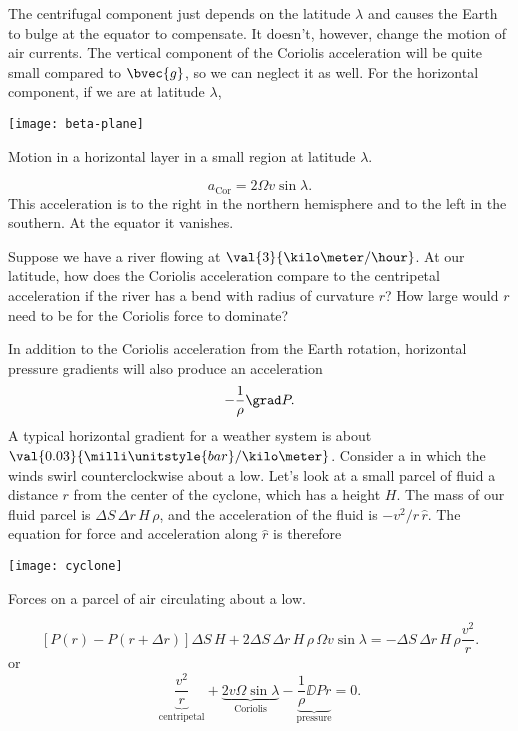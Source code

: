 The centrifugal component just depends on the latitude $\lambda$ and causes the Earth to bulge at the equator to compensate. It doesn't, however, change the motion of air currents.  The vertical component of the Coriolis acceleration will be quite small compared to $\bvec{g}$, so we can neglect it as well. For the horizontal component, if we are at latitude $\lambda$,
\begin{marginfigure}
\texttt{[image: beta-plane]}
\caption{Motion in a horizontal layer in a small region at latitude $\lambda$.}
\end{marginfigure}
\[
a_{\mathrm{Cor}} =  2\Omega v \sin\lambda.
\]
This acceleration is to the right in the northern hemisphere and to the left in the southern.  At the equator it vanishes.

\begin{exercisebox}
Suppose we have a river flowing at $\val{3}{\kilo\meter/\hour}$.  At our latitude, how does the Coriolis acceleration compare to the centripetal acceleration if the river has a bend with radius of curvature $r$?  How large would $r$ need to be for the Coriolis force to dominate?
\end{exercisebox}

In addition to the Coriolis acceleration from the Earth rotation, horizontal pressure gradients will also produce an acceleration
\[
	-\frac{1}{\rho}\grad P.
\]
A typical horizontal gradient for a weather system is about $\val{0.03}{\milli\unitstyle{bar}/\kilo\meter}$.
Consider a  in which the winds swirl counterclockwise about a low.  Let's look at a small parcel of fluid a distance $r$ from the center of the cyclone, which has a height $H$. The mass of our fluid parcel is $\Delta S\,\Delta r\,H\,\rho$, and the acceleration of the fluid is $-v^{2}/r\,\hat{r}$. The equation for force and acceleration along $\hat{r}$ is therefore
\begin{marginfigure}[-4\baselineskip]
\texttt{[image: cyclone]}
\caption{Forces on a parcel of air circulating about a low.
\label{f.cyclone}}
\end{marginfigure}
\[
	\left[P(r)-P(r+\Delta r)\right]\Delta S\,H + 2\Delta S\,\Delta r\,H\,\rho\,\Omega v\sin\lambda = -\Delta S\,\Delta r\,H\,\rho \frac{v^{2}}{r}.
\]
or
\begin{equation}\label{e.force-balance}
	\underbrace{\frac{v^{2}}{r}}_{\textrm{centripetal}} 
	+ \underbrace{2 v\Omega\sin\lambda}_{\mathrm{Coriolis}} 
	- \underbrace{\frac{1}{\rho}\DD{P}{r}}_{\mathrm{pressure}} = 0.
\end{equation}

